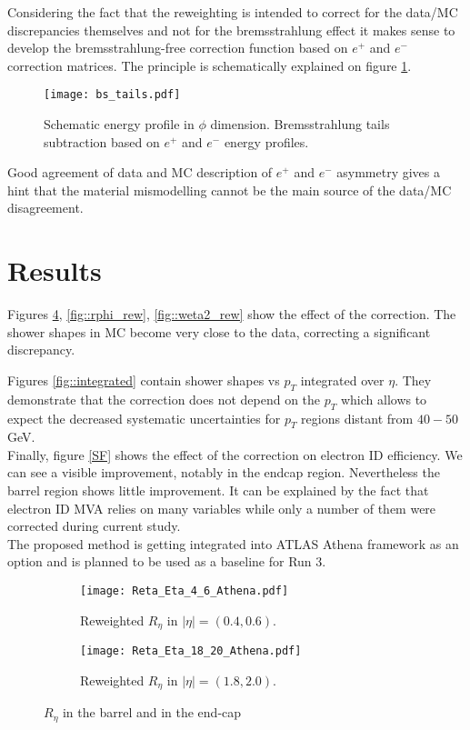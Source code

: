   
  Considering the fact that the reweighting is intended to correct for the data/MC discrepancies themselves and not for the bremsstrahlung effect it makes sense to develop the bremsstrahlung-free correction function based on $e^+$ and $e^-$ correction matrices. The principle is schematically explained on figure \ref{bstails}.\\
  \begin{figure}[htbp]
  	\begin{center}\texttt{[image: bs\_tails.pdf]}\end{center}
  	\caption{Schematic energy profile in $\phi$ dimension. Bremsstrahlung tails subtraction based on $e^+$ and $e^-$ energy profiles.}
  	\label{bstails}
  \end{figure}
  Good agreement of data and MC description of $e^+$ and $e^-$ asymmetry gives a hint that the material mismodelling cannot be the main source of the data/MC disagreement.\\
  
  \section{Results}
  Figures \ref{fig::reta}, \ref{fig::rphi_rew}, \ref{fig::weta2_rew} show the effect of the correction. The shower shapes in MC become very close to the data, correcting a significant discrepancy. 
  
  Figures \ref{fig::integrated} contain shower shapes vs $p_T$ integrated over $\eta$. They demonstrate that the correction does not depend on the $p_T$ which allows to expect the decreased systematic uncertainties for $p_T$ regions distant from $40-50$GeV.\\
  Finally, figure \ref{SF} shows the effect of the correction on electron ID efficiency. We can see a visible improvement, notably in the endcap region.
  Nevertheless the barrel region shows little improvement. It can be explained by the fact that electron ID MVA relies on many variables while only a number of them were corrected during current study.\\
  The proposed method is getting integrated into ATLAS Athena framework as an option and is planned to be used as a baseline for Run 3. 
  
  	\begin{figure}[htbp]
  	\begin{subfigure}[t]{0.5\textwidth}
  		\texttt{[image: Reta\_Eta\_4\_6\_Athena.pdf]}
  		\caption{Reweighted  $R_{\eta }$ in $|\eta| = (0.4,0.6)$.  }
  		\label{fig::idreta}
  	\end{subfigure}
  	\hfill
  	\begin{subfigure}[t]{0.5\textwidth} 
  		\texttt{[image: Reta\_Eta\_18\_20\_Athena.pdf]}
  		\caption{Reweighted  $R_{\eta }$ in $|\eta| = (1.8,2.0)$.  }
  		\label{fig::pdreta}
  	\end{subfigure}
  	\caption{$R_{\eta }$  in the barrel and in the end-cap}
  	\label{fig::reta}
  \end{figure}
 
